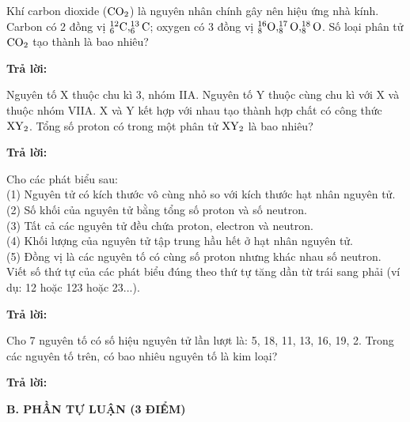 \documentclass[11pt,a4paper]{article}
\begin{document}
\begin{ex}
Khí carbon dioxide ($\ce{CO2}$) là nguyên nhân chính gây nên hiệu ứng nhà kính. Carbon có 2 đồng vị $^{12}_6\ce{C}, ^{13}_6\ce{C}$; oxygen có 3 đồng vị $^{16}_8\ce{O}, ^{17}_8\ce{O}, ^{18}_8\ce{O}$. Số loại phân tử $\ce{CO2}$ tạo thành là bao nhiêu?
\par\textbf{Trả lời:} \dotfill\end{ex}
\begin{ex}
Nguyên tố X thuộc chu kì 3, nhóm IIA. Nguyên tố Y thuộc cùng chu kì với X và thuộc nhóm VIIA. X và Y kết hợp với nhau tạo thành hợp chất có công thức $\ce{XY2}$. Tổng số proton có trong một phân tử $\ce{XY2}$ là bao nhiêu?
\par\textbf{Trả lời:} \dotfill\end{ex}
\begin{ex}
Cho các phát biểu sau:\\
(1) Nguyên tử có kích thước vô cùng nhỏ so với kích thước hạt nhân nguyên tử.\\
(2) Số khối của nguyên tử bằng tổng số proton và số neutron.\\
(3) Tất cả các nguyên tử đều chứa proton, electron và neutron.\\
(4) Khối lượng của nguyên tử tập trung hầu hết ở hạt nhân nguyên tử.\\
(5) Đồng vị là các nguyên tố có cùng số proton nhưng khác nhau số neutron.\\
Viết số thứ tự của các phát biểu đúng theo thứ tự tăng dần từ trái sang phải (ví dụ: 12 hoặc 123 hoặc 23...).
\par\textbf{Trả lời:} \dotfill\end{ex}
\begin{ex}
Cho 7 nguyên tố có số hiệu nguyên tử lần lượt là: 5, 18, 11, 13, 16, 19, 2. Trong các nguyên tố trên, có bao nhiêu nguyên tố là kim loại?
\par\textbf{Trả lời:} \dotfill\end{ex}
\vspace{6pt}
\noindent
{\color{mainGreen}\textbf{\Large B. PHẦN TỰ LUẬN (3 ĐIỂM)}}
\vspace{3pt}
\end{document}

